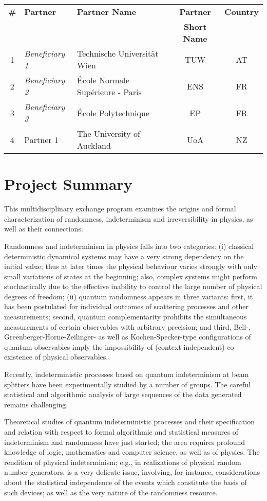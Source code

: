 \documentclass[12pt]{article}
\begin{document}
{
\begin{tabular}{|c|l|l|c|c|}
\hline
{\bf \#}&{\bf Partner}&{\bf Partner Name}&{\bf  Partner  }&{\bf  Country}\\
 & & &{\bf  Short Name}& \\
\hline
1 & {\it Beneficiary 1}&Technische Universit\"at Wien&TUW&AT\\
\hline
2 & {\it Beneficiary 2}&\'Ecole Normale Sup\'erieure - Paris&ENS&FR\\
\hline
3 & {\it Beneficiary 3}&\'Ecole Polytechnique&EP&FR\\
\hline
4 & Partner 1&The University of Auckland&UoA&NZ\\
\hline
\end{tabular}
}

\section{Project Summary}
This multidisciplinary exchange program examines the origins and formal characterization of randomness, indeterminism and irreversibility in physics, as well as their connections.

Randomness and indeterminism in physics falls into two categories: (i) classical deterministic dynamical systems may have a very strong dependency on the initial value; thus at later times the physical behaviour varies strongly with only small variations of states at the beginning; also, complex systems might perform stochastically due to the effective inability to control the large number of physical degrees of freedom; (ii) quantum randomness appears in three variants: first, it has been postulated for individual outcomes of scattering processes and other measurements; second, quantum complementarity prohibits the simultaneous measurements of certain observables with arbitrary precision; and third, Bell-, Greenberger-Horne-Zeilinger- as well as Kochen-Specker-type configurations of quantum observables imply the impossibility of (context independent) co-existence of physical observables.

Recently, indeterministic processes based on quantum indeterminism at beam splitters have been experimentally studied by a number of groups. The careful statistical and algorithmic analysis of large sequences of the data generated remains challenging.

Theoretical studies of quantum indeterministic processes and their specification and relation with respect to formal algorithmic and statistical measures of indeterminism and randomness have just started; the area requires profound knowledge of logic, mathematics and computer science, as well as of physics. The rendition of physical indeterminism; e.g., in realizations of physical random number generators, is a very delicate issue, involving, for instance, considerations about the statistical independence of the events which constitute the basis of such devices; as well as the very nature of the randomness resource.
\end{document}
